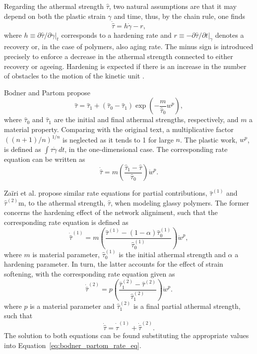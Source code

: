 Regarding the athermal strength $\hat \tau$, two natural assumptions are that it may depend on both the plastic strain $\gamma$ and time, thus, by the chain rule, one finds
\begin{equation}
  \dot{\hat \tau} = h \dot\gamma - r,
\end{equation}
where $h\equiv \partial \hat \tau/\partial \gamma |_t$ corresponds to a hardening rate and $r\equiv - \partial \hat \tau/\partial t|_\gamma$ denotes a recovery or, in the case of polymers, also aging rate.
The minus sign is introduced precisely to enforce a decrease in the athermal strength connected to either recovery or ageeing.
Hardening is expected if there is an increase in the number of obstacles to the motion of the kinetic unit \citep{kocks1975thermodynamics, hasanConstitutiveModelNonlinear1995}.

Bodner and Partom \citep{bodnerConstitutiveEquationsElasticViscoplastic1975} propose
\begin{equation}
  \hat \tau = {\hat \tau}_1 + ({\hat \tau}_0 - {\hat \tau}_1)\exp\left(-\frac{m}{{\hat \tau}_0}w^p\right),
\end{equation}
where ${\hat \tau}_0$ and ${\hat \tau}_1$ are the initial and final athermal strengths, respectively, and $m$ a material property.
Comparing with the original text, a multiplicative factor $((n+1)/n)^{1/n}$ is neglected as it tends to 1 for large $n$.
The plastic work, $w^p$, is defined as $\int \tau\dot \gamma\ dt$, in the one-dimensional case.
The corresponding rate equation can be written as
\begin{equation}
  \label{eq:bodner_partom_rate_eq}
  \dot{\hat \tau} = m\left(\frac{{\hat \tau}_1 - {\hat \tau}}{{\hat \tau}_0}\right)\dot w^p.
\end{equation}

Zaïri et al. \citep{zairiElastoviscoplasticConstitutiveEquations2007} propose similar rate equations for partial contributions, $\hat \tau^{(1)}$ and $\hat \tau^{(2)}$m, to the athermal strength, $\hat \tau$, when modeling glassy polymers.
The former concerns the hardening effect of the network aligniment, such that the corresponding rate equation is defined as
\begin{equation}
  \dot{\hat\tau}^{(1)} = m\left(\frac{\hat\tau^{(1)} - (1 - \alpha)\hat\tau^{(1)}_0}{\hat\tau^{(1)}_0}\right)\dot w^p,
\end{equation}
where $m$ is material parameter, $\hat\tau^{(1)}_0$ is the initial athermal strength and $\alpha$ a hardening parameter.
In turn, the latter accounts for the effect of strain softening, with the corresponding rate equation given as
\begin{equation}
  \dot{\hat\tau}^{(2)} = p\left(\frac{\hat\tau^{(2)}_1 - \hat\tau^{(2)}}{\hat\tau^{(2)}_1}\right)\dot w^p.
\end{equation}
where $p$ is a material parameter and $\hat\tau^{(2)}_1$ is a final partial athermal strength, such that
\begin{equation}
  \label{eq:rate_eq_zairi}
  \dot{\hat \tau} = \dot{\hat\tau}^{(1)} + \dot{\hat\tau}^{(2)}.
\end{equation}
The solution to both equations can be found substituting the appropriate values into Equation~\eqref{eq:bodner_partom_rate_eq}.

